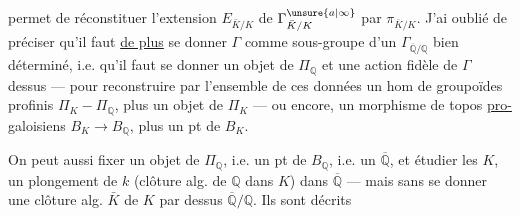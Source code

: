 permet de réconstituer l'extension $E_{\bar K/K}$ de $\Gamma^{\unsure{a|\infty}}_{\bar K/K}$ par $\pi_{\bar K/K}$. J'ai oublié de préciser qu'il faut \uline{de plus} se donner $\Gamma$ comme sous-groupe d'un $\Gamma_{\overline{\mathbb Q}/\mathbb Q}$ bien déterminé, i.e. qu'il faut se donner un objet de $\Pi_{\mathbb Q}$ et une action fidèle de $\Gamma$ dessus --- pour reconstruire par l'ensemble de ces données un hom de groupoïdes profinis $\Pi_K-\Pi_{\mathbb Q}$, plus un objet de $\Pi_K$ --- ou encore, un morphisme de topos \uline{pro-}galoisiens $B_K\longrightarrow B_{\mathbb Q}$, plus un pt de $B_K$.

On peut aussi fixer un objet de $\Pi_{\mathbb Q}$, i.e. un pt de $B_{\mathbb Q}$, i.e. un $\overline{\mathbb Q}$, et étudier les $K$,  un plongement de $k$ (clôture alg. de $\mathbb Q$ dans $K$) dans $\overline{\mathbb Q}$ ---  mais sans se donner une clôture alg. $\bar K$ de $K$ par dessus $\overline{\mathbb Q}/\mathbb Q$. Ils sont décrits
